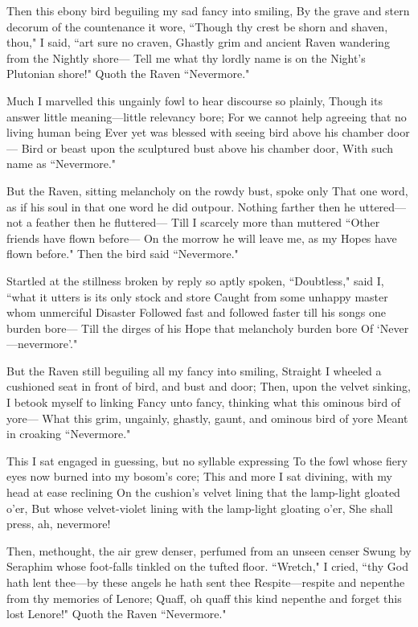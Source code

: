 \documentclass{article}
\begin{document}
Then this ebony bird beguiling my sad fancy into smiling,
By the grave and stern decorum of the countenance it wore,
``Though thy crest be shorn and shaven, thou," I said, ``art sure no craven,
Ghastly grim and ancient Raven wandering from the Nightly shore---
Tell me what thy lordly name is on the Night’s Plutonian shore!"
Quoth the Raven ``Nevermore."

Much I marvelled this ungainly fowl to hear discourse so plainly,
Though its answer little meaning---little relevancy bore;
For we cannot help agreeing that no living human being
Ever yet was blessed with seeing bird above his chamber door---
Bird or beast upon the sculptured bust above his chamber door,
With such name as ``Nevermore."

But the Raven, sitting melancholy on the rowdy bust, spoke only
That one word, as if his soul in that one word he did outpour.
Nothing farther then he uttered---not a feather then he fluttered---
Till I scarcely more than muttered ``Other friends have flown before---
On the morrow he will leave me, as my Hopes have flown before."
Then the bird said ``Nevermore."

Startled at the stillness broken by reply so aptly spoken,
``Doubtless," said I, ``what it utters is its only stock and store
Caught from some unhappy master whom unmerciful Disaster
Followed fast and followed faster till his songs one burden bore---
Till the dirges of his Hope that melancholy burden bore
Of ‘Never---nevermore’."

But the Raven still beguiling all my fancy into smiling,
Straight I wheeled a cushioned seat in front of bird, and bust and door;
Then, upon the velvet sinking, I betook myself to linking
Fancy unto fancy, thinking what this ominous bird of yore---
What this grim, ungainly, ghastly, gaunt, and ominous bird of yore
Meant in croaking ``Nevermore."

This I sat engaged in guessing, but no syllable expressing
To the fowl whose fiery eyes now burned into my bosom’s core;
This and more I sat divining, with my head at ease reclining
On the cushion’s velvet lining that the lamp-light gloated o’er,
But whose velvet-violet lining with the lamp-light gloating o’er,
She shall press, ah, nevermore!

Then, methought, the air grew denser, perfumed from an unseen censer
Swung by Seraphim whose foot-falls tinkled on the tufted floor.
``Wretch," I cried, ``thy God hath lent thee---by these angels he hath sent thee
Respite---respite and nepenthe from thy memories of Lenore;
Quaff, oh quaff this kind nepenthe and forget this lost Lenore!"
Quoth the Raven ``Nevermore."
\end{document}

